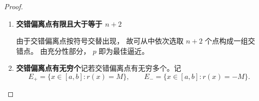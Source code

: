 \begin{proof}
\begin{enumerate}
令 $\phi(x) = \prod_{i=1}^{N-1}(x-\xi_i)\in P_{N-1}\subseteq P_n$。构造 $q(x)=p(x)+c\phi(x)$。我们通过选取合适的 $c$ 去导出 $q(x)$ 是比 $p(x)$ 更好的逼近，从而导致矛盾。

不妨设在 $[a, \xi_1]$ 上 $r(x) \leqslant  0$ 并且 $\phi(x)$ 在 $[a, \xi_1]$ 上满足 $\phi(x)  \leqslant  0$（这只是符号上的问题）。
记 $K = \|\phi\|$.

此时 $-M  \leqslant  r(x) < M-\alpha $  注意到 $\phi(x)$ 与 $r(x)$ 在 $[a, \xi_1]$ 上符号相同。因为
$$
\begin{aligned}
f(x) - q(x) &= f(x) - p(x) - c\phi(x)  \\
              &= r(x) - c\phi(x) \\
              &= r(x) + c|\phi(x)| \\
\end{aligned}$$
这里由于 $r(x)  \leqslant  0$ 并且 $\phi(x)  \leqslant  0$，所以 
当 $c$ 满足 $ 0 < c| \phi(x) |  \leqslant  |c\cdot K| < \frac{\alpha}{2}$ 并且 $c>0$ 时
有
$$
\begin{aligned}
-M  < r(x) - c\phi(x) < M -\alpha + \frac{\alpha}{2} \\ 
\end{aligned}
$$
同理，在区间 $[\xi_1, \xi_2]$ 上我们能够利用
$$
\begin{aligned}
 -M +\alpha < r(x)  \leqslant  M
\end{aligned}
$$
和
$$
\begin{aligned}
f(x) - q(x) &= f(x) - p(x) - c\phi(x)  \\
              &= r(x) - c\phi(x) \\
              &= r(x) - c|\phi(x)| \\
\end{aligned}
$$
得到
$$
\begin{aligned}
-M + \alpha - \frac{\alpha}{2} < r(x) - c\phi(x) < M 
\end{aligned}$$
注意到上述过程与子区间的选择无关，因此在每个子区间上都满足上述不等式。
从而有 $$\|f-q\| < M = \|f-p\|$$，并且根据 $q$ 的构造可以得知它是不超过$n$ 次的多项式，
于是与 $\|f-q\| < \|f-p\|$矛盾。

\item \textbf{交错偏离点有限且大于等于 $n+2$} 

由于交错偏离点按符号交替出现，
故可从中依次选取
$n+2$
个点构成一组交错点。
由充分性部分，
$p$
即为最佳逼近。

\item \textbf{交错偏离点有无穷个}记若交错偏离点有无穷多个。记
$$
E_+=\{x\in[a,b]:r(x)=M\},\qquad
E_-=\{x\in[a,b]:r(x)=-M\}.
$$


\end{enumerate}
\end{proof}
